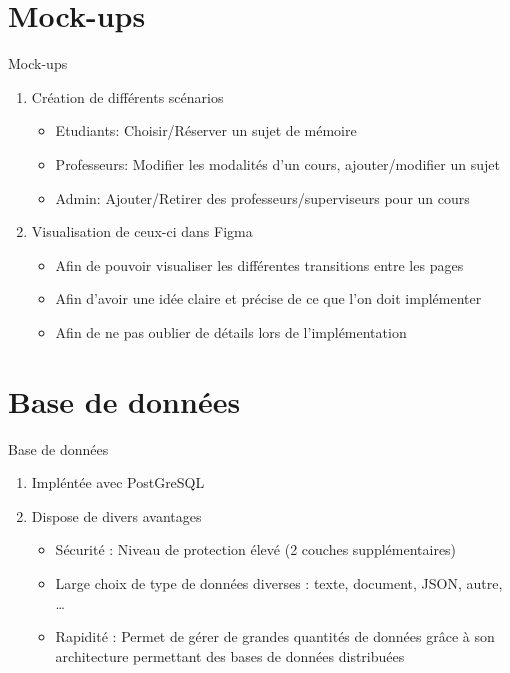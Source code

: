 \documentclass[numbering=fraction,10pt]{beamer}
\begin{document}
\section{Mock-ups}
\begin{frame}{Mock-ups}
    \begin{enumerate}
        \item Création de différents scénarios
        \begin{itemize}
            \item Etudiants: Choisir/Réserver un sujet de mémoire
            \item Professeurs: Modifier les modalités d'un cours, ajouter/modifier un sujet
            \item Admin: Ajouter/Retirer des professeurs/superviseurs pour un cours
        \end{itemize}
        \item Visualisation de ceux-ci dans Figma
        \begin{itemize}
            \item Afin de pouvoir visualiser les différentes transitions entre les pages
            \item Afin d'avoir une idée claire et précise de ce que l'on doit implémenter
            \item Afin de ne pas oublier de détails lors de l'implémentation
        \end{itemize}
    \end{enumerate}
\end{frame}
\section{Base de données}
\begin{frame}{Base de données}
    \begin{enumerate}
        \item Impléntée avec PostGreSQL
        \item Dispose de divers avantages
        \begin{itemize}
            \item Sécurité : Niveau de protection élevé (2 couches supplémentaires)
            \item Large choix de type de données diverses : texte, document, JSON, autre, \dots
            \item Rapidité : Permet de gérer de grandes quantités de données grâce à son architecture permettant des bases de données distribuées
        \end{itemize}
    \end{enumerate}
\end{frame}
\end{document}
